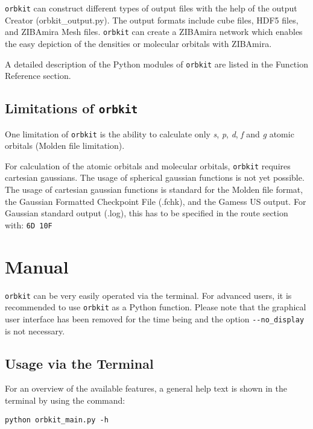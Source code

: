 \documentclass[a4paper,10pt]{scrartcl}
\begin{document}
\texttt{orbkit} can construct different types of output files with the help
of the output Creator (orbkit\_output.py). The output formats include
cube files, HDF5 files, and ZIBAmira Mesh files. \texttt{orbkit} can create
a ZIBAmira network which enables the easy depiction of the densities
or molecular orbitals with ZIBAmira. 


A detailed description of the Python modules of \texttt{orbkit} are listed
in the Function Reference section.


\subsection{Limitations of \texttt{orbkit}}

One limitation of \texttt{orbkit} is the ability to calculate only \emph{s},
\emph{p}, \emph{d}, \emph{f} and \emph{g} atomic orbitals (Molden
file limitation).

For calculation of the atomic orbitals and molecular orbitals,
\texttt{orbkit} requires cartesian gaussians. The usage of spherical gaussian
functions is not yet possible. The usage of cartesian gaussian functions
is standard for the Molden file format, the Gaussian Formatted Checkpoint
File (.fchk), and the Gamess US output. For Gaussian standard output
(.log), this has to be specified in the route section with: \texttt{6D
10F}


\section{Manual}

\texttt{orbkit} can be very easily operated via the terminal. For advanced
users, it is recommended to use \texttt{orbkit} as a Python function. Please
note that the graphical user interface has been removed for the time being
and the option \verb!--no_display! is not necessary.


\subsection{Usage via the Terminal}

For an overview of the available features, a general help text is
shown in the terminal by using the command:

\begin{verbatim}
python orbkit_main.py -h
\end{verbatim}
\end{document}
